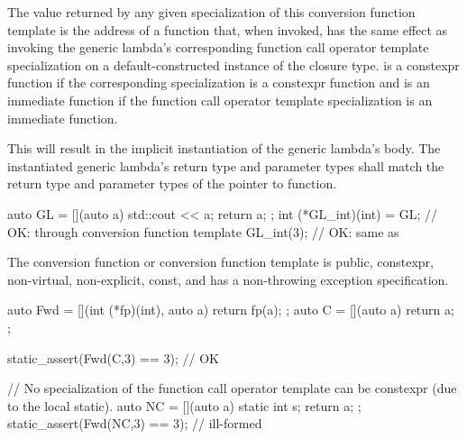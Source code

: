 \pnum
The value returned by any given specialization of this conversion function
template is the address of a function  that, when invoked, has the same
effect as invoking the generic lambda's corresponding function call operator
template specialization on a default-constructed instance of the closure type.
 is a constexpr function
if the corresponding specialization is a constexpr function and
 is an immediate function
if the function call operator template specialization is an immediate function.
\begin{note}
This will result in the implicit instantiation of the generic lambda's body.
The instantiated generic lambda's return type and parameter types shall match
the return type and parameter types of the pointer to function.
\end{note}
\begin{example}
\begin{codeblock}
auto GL = [](auto a) { std::cout << a; return a; };
int (*GL_int)(int) = GL;        // OK: through conversion function template
GL_int(3);                      // OK: same as 
\end{codeblock}
\end{example}

\pnum
The conversion function or conversion function template is public,
constexpr, non-virtual, non-explicit, const, and has a non-throwing exception
specification.
\begin{example}
\begin{codeblock}
auto Fwd = [](int (*fp)(int), auto a) { return fp(a); };
auto C = [](auto a) { return a; };

static_assert(Fwd(C,3) == 3);   // OK

// No specialization of the function call operator template can be constexpr (due to the local static).
auto NC = [](auto a) { static int s; return a; };
static_assert(Fwd(NC,3) == 3);  // ill-formed
\end{codeblock}
\end{example}

